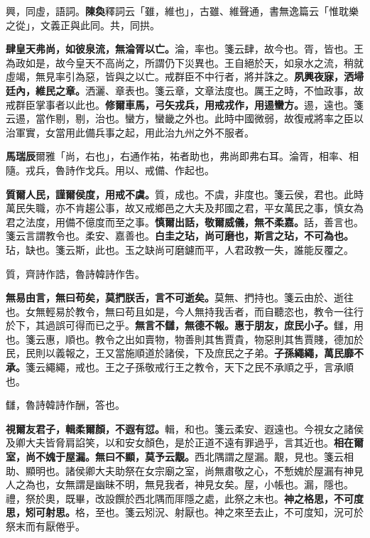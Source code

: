 \begin{quoting}興，同虛，語詞。\textbf{陳奐}釋詞云「雖，維也」，古雖、維聲通，書無逸篇云「惟耽樂之從」，文義正與此同。共，同拱。\end{quoting}

\textbf{肆皇天弗尚，如彼泉流，無淪胥以亡。}{\footnotesize 淪，率也。箋云肆，故今也。胥，皆也。王為政如是，故今皇天不高尚之，所謂仍下災異也。王自絕於天，如泉水之流，稍就虛竭，無見率引為惡，皆與之以亡。戒群臣不中行者，將并誅之。}\textbf{夙興夜寐，洒埽廷內，維民之章。}{\footnotesize 洒灑、章表也。箋云章，文章法度也。厲王之時，不恤政事，故戒群臣掌事者以此也。}\textbf{修爾車馬，弓矢戎兵，用戒戎作，用逷蠻方。}{\footnotesize 逷，遠也。箋云逷，當作剔，剔，治也。蠻方，蠻畿之外也。此時中國微弱，故復戒將率之臣以治軍實，女當用此備兵事之起，用此治九州之外不服者。}

\begin{quoting}\textbf{馬瑞辰}爾雅「尚，右也」，右通作祐，祐者助也，弗尚即弗右耳。淪胥，相率、相隨。戎兵，魯詩作戈兵。用以、戒備、作起也。\end{quoting}

\textbf{質爾人民，謹爾侯度，用戒不虞。}{\footnotesize 質，成也。不虞，非度也。箋云侯，君也。此時萬民失職，亦不肯趨公事，故又戒鄉邑之大夫及邦國之君，平女萬民之事，慎女為君之法度，用備不億度而至之事。}\textbf{慎爾出話，敬爾威儀，無不柔嘉。}{\footnotesize 話，善言也。箋云言謂教令也。柔安、嘉善也。}\textbf{白圭之玷，尚可磨也，斯言之玷，不可為也。}{\footnotesize 玷，缺也。箋云斯，此也。玉之缺尚可磨鑢而平，人君政教一失，誰能反覆之。}

\begin{quoting}質，齊詩作誥，魯詩韓詩作吿。\end{quoting}

\textbf{無易由言，無曰苟矣，莫捫朕舌，言不可逝矣。}{\footnotesize 莫無、捫持也。箋云由於、逝往也。女無輕易於教令，無曰苟且如是，今人無持我舌者，而自聽恣也，教令一往行於下，其過誤可得而已之乎。}\textbf{無言不讎，無德不報。惠于朋友，庶民小子。}{\footnotesize 讎，用也。箋云惠，順也。教令之出如賣物，物善則其售賈貴，物惡則其售賈賤，德加於民，民則以義報之，王又當施順道於諸侯，下及庶民之子弟。}\textbf{子孫繩繩，萬民靡不承。}{\footnotesize 箋云繩繩，戒也。王之子孫敬戒行王之教令，天下之民不承順之乎，言承順也。}

\begin{quoting}讎，魯詩韓詩作酬，答也。\end{quoting}

\textbf{視爾友君子，輯柔爾顏，不遐有愆。}{\footnotesize 輯，和也。箋云柔安、遐遠也。今視女之諸侯及卿大夫皆脅肩諂笑，以和安女顏色，是於正道不遠有罪過乎，言其近也。}\textbf{相在爾室，尚不媿于屋漏。無曰不顯，莫予云覯。}{\footnotesize 西北隅謂之屋漏。覯，見也。箋云相助、顯明也。諸侯卿大夫助祭在女宗廟之室，尚無肅敬之心，不慙媿於屋漏有神見人之為也，女無謂是幽昧不明，無見我者，神見女矣。屋，小帳也。漏，隱也。禮，祭於奧，既畢，改設饌於西北隅而厞隱之處，此祭之末也。}\textbf{神之格思，不可度思，矧可射思。}{\footnotesize 格，至也。箋云矧況、射厭也。神之來至去止，不可度知，況可於祭末而有厭倦乎。}

